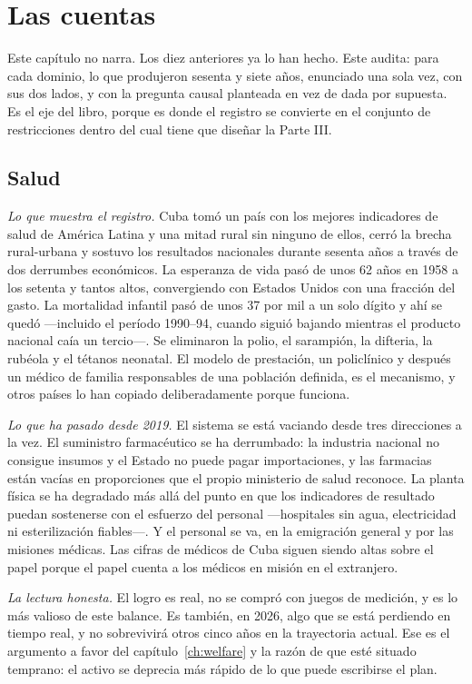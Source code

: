 \chapter{Las cuentas}
\label{ch:ledgerch}

Este capítulo no narra. Los diez anteriores ya lo han hecho. Este audita: para cada
dominio, lo que produjeron sesenta y siete años, enunciado una sola vez, con sus
dos lados, y con la pregunta causal planteada en vez de dada por supuesta. Es el
eje del libro, porque es donde el registro se convierte en el conjunto de
restricciones dentro del cual tiene que diseñar la Parte III.

\section{Salud}

\emph{Lo que muestra el registro.} Cuba tomó un país con los mejores indicadores de
salud de América Latina y una mitad rural sin ninguno de ellos, cerró la brecha
rural-urbana y sostuvo los resultados nacionales durante sesenta años a través de
dos derrumbes económicos. La esperanza de vida pasó de unos 62 años en 1958 a los
setenta y tantos altos, convergiendo con Estados Unidos con una fracción del gasto.
La mortalidad infantil pasó de unos 37 por mil a un solo dígito y ahí se quedó
---incluido el período 1990--94, cuando siguió bajando mientras el producto
nacional caía un tercio---. Se eliminaron la polio, el sarampión, la difteria, la
rubéola y el tétanos neonatal. El modelo de prestación, un policlínico y después un
médico de familia responsables de una población definida, es el mecanismo, y otros
países lo han copiado deliberadamente porque funciona.

\emph{Lo que ha pasado desde 2019.} El sistema se está vaciando desde tres
direcciones a la vez. El suministro farmacéutico se ha derrumbado: la industria
nacional no consigue insumos y el Estado no puede pagar importaciones, y las
farmacias están vacías en proporciones que el propio ministerio de salud reconoce.
La planta física se ha degradado más allá del punto en que los indicadores de
resultado puedan sostenerse con el esfuerzo del personal ---hospitales sin agua,
electricidad ni esterilización fiables---. Y el personal se va, en la emigración
general y por las misiones médicas. Las cifras de médicos de Cuba siguen siendo
altas sobre el papel porque el papel cuenta a los médicos en misión en el
extranjero.

\emph{La lectura honesta.} El logro es real, no se compró con juegos de medición, y
es lo más valioso de este balance. Es también, en 2026, algo que se está perdiendo
en tiempo real, y no sobrevivirá otros cinco años en la trayectoria actual. Ese es
el argumento a favor del capítulo~\ref{ch:welfare} y la razón de que esté situado
temprano: el activo se deprecia más rápido de lo que puede escribirse el plan.

